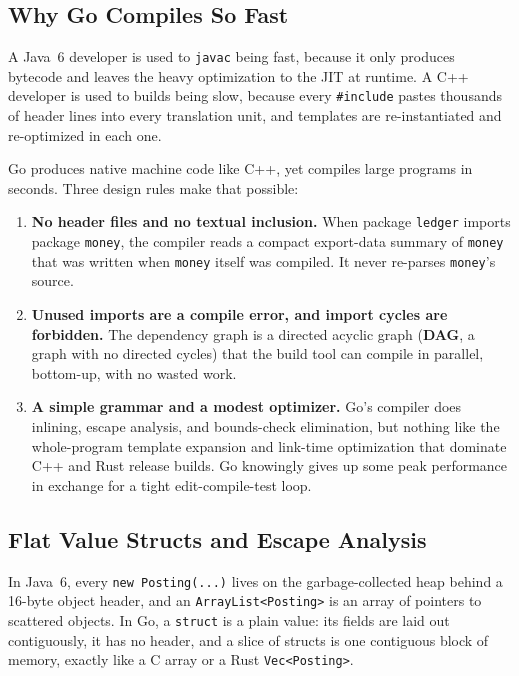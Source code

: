 \subsection{Why Go Compiles So Fast}

A Java~6 developer is used to \texttt{javac} being fast, because it only produces bytecode and leaves the heavy optimization to the JIT at runtime. A C++ developer is used to builds being slow, because every \texttt{\#include} pastes thousands of header lines into every translation unit, and templates are re-instantiated and re-optimized in each one.

Go produces native machine code like C++, yet compiles large programs in seconds. Three design rules make that possible:
\begin{enumerate}
  \item \textbf{No header files and no textual inclusion.} When package \texttt{ledger} imports package \texttt{money}, the compiler reads a compact export-data summary of \texttt{money} that was written when \texttt{money} itself was compiled. It never re-parses \texttt{money}'s source.
  \item \textbf{Unused imports are a compile error, and import cycles are forbidden.} The dependency graph is a directed acyclic graph (\textbf{DAG}, a graph with no directed cycles) that the build tool can compile in parallel, bottom-up, with no wasted work.
  \item \textbf{A simple grammar and a modest optimizer.} Go's compiler does inlining, escape analysis, and bounds-check elimination, but nothing like the whole-program template expansion and link-time optimization that dominate C++ and Rust release builds. Go knowingly gives up some peak performance in exchange for a tight edit-compile-test loop.
\end{enumerate}

\subsection{Flat Value Structs and Escape Analysis}

In Java~6, every \texttt{new Posting(...)} lives on the garbage-collected heap behind a 16-byte object header, and an \texttt{ArrayList<Posting>} is an array of pointers to scattered objects. In Go, a \texttt{struct} is a plain value: its fields are laid out contiguously, it has no header, and a slice of structs is one contiguous block of memory, exactly like a C array or a Rust \texttt{Vec<Posting>}.


